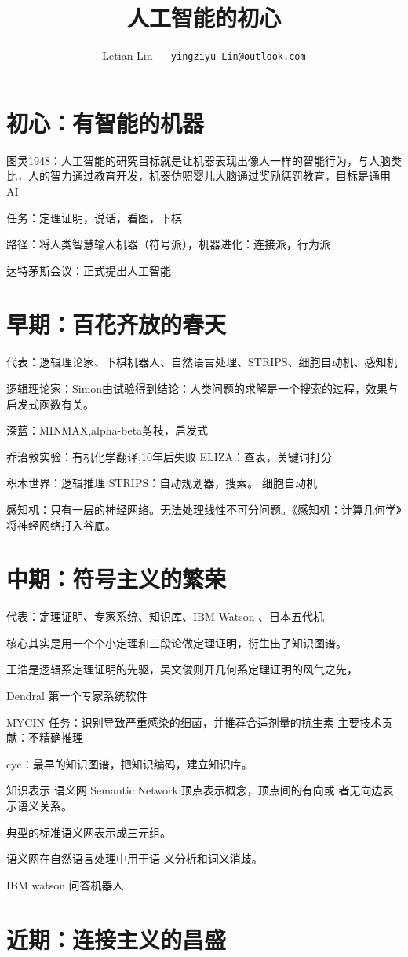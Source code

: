 \documentclass[UTF8]{ctexart}
\title{
  人工智能的初心
}
\author{
	Letian Lin --- \texttt{yingziyu-Lin@outlook.com}
}
\begin{document}
\maketitle
\section{初心：有智能的机器}
图灵1948：人工智能的研究目标就是让机器表现出像人一样的智能行为，与人脑类比，人的智力通过教育开发，机器仿照婴儿大脑通过奖励惩罚教育，目标是通用AI

任务：定理证明，说话，看图，下棋

路径：将人类智慧输入机器（符号派），机器进化：连接派，行为派

达特茅斯会议：正式提出人工智能

\section{早期：百花齐放的春天}
代表：逻辑理论家、下棋机器⼈、自然语⾔处理、STRIPS、细胞自动机、感知机

逻辑理论家：Simon由试验得到结论：人类问题的求解是一个搜索的过程，效果与启发式函数有关。

深蓝：MINMAX,alpha-beta剪枝，启发式

乔治敦实验：有机化学翻译,10年后失败 ELIZA：查表，关键词打分

积木世界：逻辑推理 STRIPS：自动规划器，搜索。 细胞自动机

感知机：只有一层的神经网络。无法处理线性不可分问题。《感知机：计算几何学》将神经网络打入谷底。

\section{中期：符号主义的繁荣}
代表：定理证明、专家系统、知识库、IBM Watson 、日本五代机

核心其实是用一个个小定理和三段论做定理证明，衍生出了知识图谱。

王浩是逻辑系定理证明的先驱，吴文俊则开几何系定理证明的风气之先，

Dendral 第一个专家系统软件

MYCIN 任务：识别导致严重感染的细菌，并推荐合适剂量的抗生素 主要技术贡献：不精确推理

cyc：最早的知识图谱，把知识编码，建立知识库。

知识表示 语义网 Semantic Network;顶点表示概念，顶点间的有向或
者无向边表示语义关系。

典型的标准语义网表示成三元组。

语义网在自然语言处理中用于语
义分析和词义消歧。

IBM watson 问答机器人
\section{近期：连接主义的昌盛}
\end{document}
